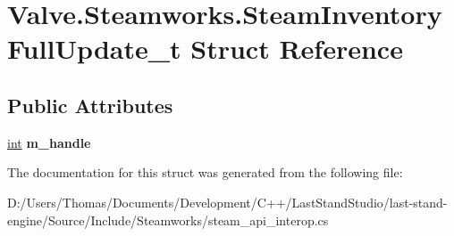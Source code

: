 \hypertarget{structValve_1_1Steamworks_1_1SteamInventoryFullUpdate__t}{}\section{Valve.\+Steamworks.\+Steam\+Inventory\+Full\+Update\+\_\+t Struct Reference}
\label{structValve_1_1Steamworks_1_1SteamInventoryFullUpdate__t}
\subsection*{Public Attributes}
\begin{DoxyCompactItemize}
\item 
\hypertarget{structValve_1_1Steamworks_1_1SteamInventoryFullUpdate__t_af0387b4232e468a7de78af160fc0f73b}{}\hyperlink{SDL__thread_8h_a6a64f9be4433e4de6e2f2f548cf3c08e}{int} {\bfseries m\+\_\+handle}\label{structValve_1_1Steamworks_1_1SteamInventoryFullUpdate__t_af0387b4232e468a7de78af160fc0f73b}

\end{DoxyCompactItemize}


The documentation for this struct was generated from the following file\+:\begin{DoxyCompactItemize}
\item 
D\+:/\+Users/\+Thomas/\+Documents/\+Development/\+C++/\+Last\+Stand\+Studio/last-\/stand-\/engine/\+Source/\+Include/\+Steamworks/steam\+\_\+api\+\_\+interop.\+cs\end{DoxyCompactItemize}
